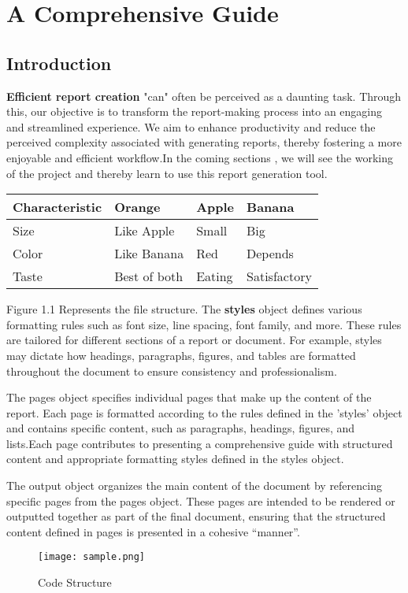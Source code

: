 \documentclass[oneside]{book}
\newcommand{\quotes}[1]{"#1"}
\begin{document}
\setcounter{page}{0}
\tableofcontents
\newpage\listoffigures
\clearpage
{}
\setcounter{page}{1}
\newpage
\chapter{A Comprehensive Guide}
\section{Introduction}
\textbf{Efficient report creation} \quotes{can} often be perceived as a daunting task. Through this, our objective is to transform the report-making process
             into an engaging and streamlined experience. We aim to enhance productivity and reduce the perceived complexity associated with generating reports,
             thereby fostering a more enjoyable and efficient workflow.In the coming sections , we will see the working of the project and thereby learn to use this
              report generation tool.\par
\begin{table}[h!]
\centering
\begin{tabularx}{\textwidth}{| X | X | X | X |}
\hline
\textbf{Characteristic} & \textbf{Orange} & \textbf{Apple} & \textbf{Banana} \\ \hline
Size & Like Apple & Small & Big \\ \hline
Color & Like Banana & Red & Depends \\ \hline
Taste & Best of both & Eating & Satisfactory \\ \hline
\end{tabularx}
\label{table:1}
\end{table}
Figure 1.1 Represents the file structure.
            The \textbf{styles} object defines various formatting rules such as font size, line spacing, font family, and more. These rules are tailored for different 
            sections of a  report or document. For example, styles may dictate how headings, paragraphs, figures, and tables are formatted throughout the document 
            to ensure consistency and professionalism.\par
The pages object specifies individual pages that make up the content of the report. Each page is formatted according to the 
            rules defined in the 'styles' object and contains specific content, such as paragraphs, headings, figures, and lists.Each page contributes to presenting a 
            comprehensive guide with structured content and appropriate formatting styles defined in the styles object.\par
The output object organizes the main content of the document by referencing specific pages from the pages object.
            These pages are intended to be rendered or outputted together as part of the final document, ensuring that the structured content defined in pages is 
            presented in a cohesive ``manner''.\par
\begin{figure}[h]
\centering
\texttt{[image: sample.png]}
\caption{Code Structure}
\end{figure}
\end{document}
